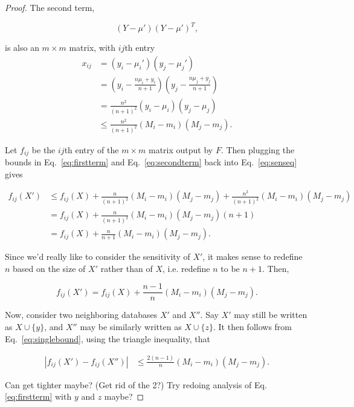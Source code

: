 \documentclass[11pt, oneside]{article}   	%
\begin{document}
\begin{proof}
The second term, 

$$ (Y-\mu')(Y-\mu')^T, $$

is also an $m \times m$ matrix, with $ij$th entry
\begin{align}
x_{ij} &= (y_i - \mu_i') (y_j - \mu_j') \nonumber\\
	&= \left( y_i - \frac{n\mu_i + y_i}{n+1} \right)\left( y_j - \frac{n\mu_j + y_j}{n+1} \right) \nonumber\\
	&= \frac{n^2}{(n+1)^2}(y_i - \mu_i)(y_j - \mu_j) \nonumber\\
	&\le \frac{n^2}{(n+1)^2}(M_i - m_i)(M_j - m_j).
\label{eq:secondterm}
\end{align}

Let $f_{ij}$ be the $ij$th entry of the $m\times m$ matrix output by $F$. Then plugging the bounds in Eq.~\ref{eq:firstterm} and Eq.~\ref{eq:secondterm} back into Eq.~\ref{eq:senseq} gives

\begin{align}
f_{ij}(X') &\le f_{ij}(X) + \frac{n}{(n+1)^2} (M_i-m_i)(M_j-m_j) + \frac{n^2}{(n+1)^2}(M_i - m_i)(M_j - m_j) \nonumber \\
&= f_{ij}(X) +\frac{n}{(n+1)^2}(M_i - m_i)(M_j - m_j)(n+1) \nonumber\\
&= f_{ij}(X) + \frac{n}{n+1}(M_i - m_i)(M_j - m_j).
\end{align}

Since we'd really like to consider the sensitivity of $X'$, it makes sense to redefine $n$ based on the size of $X'$ rather than of $X$, i.e. redefine $n$ to be $n+1$. Then,

\begin{equation}
f_{ij}(X') = f_{ij}(X) + \frac{n-1}{n}(M_i - m_i)(M_j - m_j).
\label{eq:singlebound}
\end{equation}

Now, consider two neighboring databases $X'$ and $X''$. Say $X'$ may still be written as $X \cup \{y\}$, and $X''$ may be similarly written as $X \cup \{z\}.$ It then follows from Eq.~\ref{eq:singlebound}, using the triangle inequality, that

\begin{align*}
\left\vert f_{ij}(X')-f_{ij}(X'') \right\vert &\le \frac{2(n-1)}{n}(M_i - m_i)(M_j - m_j).
\end{align*}

Can get tighter maybe? (Get rid of the 2?) Try redoing analysis of Eq. \ref{eq:firstterm} with $y$ and $z$ maybe?

\end{proof}
\end{document}
